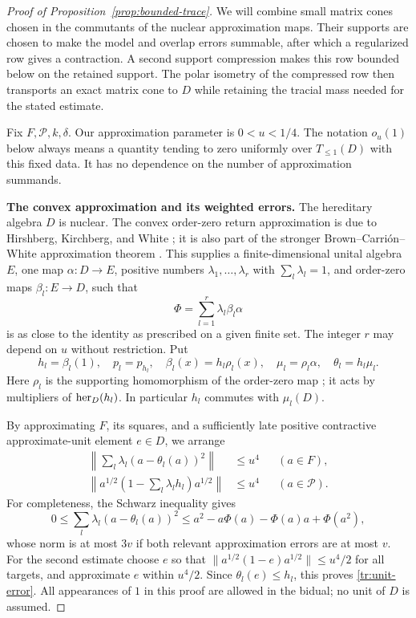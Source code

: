\begin{proof}[Proof of Proposition~\ref{prop:bounded-trace}]
We will combine small matrix cones chosen in the commutants of the
nuclear approximation maps. Their supports are chosen to make the
model and overlap errors summable, after which a regularized row gives
a contraction. A second support compression makes this row bounded
below on the retained support. The polar isometry of the compressed
row then transports an exact matrix cone to $D$ while retaining the
tracial mass needed for the stated estimate.

Fix $F,\mathcal P,k,\delta$.  Our approximation parameter is
$0<u<1/4$.  The notation $o_u(1)$ below always means a quantity tending
to zero uniformly over $T_{\leq1}(D)$ with this fixed data.  It has no
dependence on the number of approximation summands.

\medskip\noindent
\textbf{The convex approximation and its weighted errors.}
The hereditary algebra $D$ is nuclear. The convex order-zero return
approximation is due to Hirshberg, Kirchberg, and White
\cite[Theorem~1.4]{HKW2012}; it is also part of the stronger
Brown--Carri\'on--White approximation theorem
\cite[Theorem~3.1]{BCW2019}. This supplies a finite-dimensional unital algebra
$E$, one \cpc map $\alpha:D\to E$, positive numbers
$\lambda_1,\ldots,\lambda_r$ with $\sum_l\lambda_l=1$, and \cpc
order-zero maps $\beta_l:E\to D$, such that
\[
 \Phi=\sum_{l=1}^r\lambda_l\beta_l\alpha
\]
is as close to the identity as prescribed on a given finite set.
The integer $r$ may depend on $u$ without restriction.  Put
\[
 h_l=\beta_l(1),\quad p_l=p_{h_l},\quad
 \beta_l(x)=h_l\rho_l(x),\quad
 \mu_l=\rho_l\alpha,\quad\theta_l=h_l\mu_l.
\]
Here $\rho_l$ is the supporting homomorphism of the order-zero map
\cite{WZ2009}; it acts by multipliers of $\operatorname{her}_D(h_l)$.
In particular $h_l$ commutes with $\mu_l(D)$.

By approximating $F$, its squares, and a sufficiently late positive
contractive approximate-unit element $e\in D$, we arrange
\begin{align}
 \left\|\sum_l\lambda_l(a-\theta_l(a))^2\right\|
 &\leq u^4 &&(a\in F),\label{tr:mean-square}\\
 \left\|a^{1/2}\left(1-\sum_l\lambda_lh_l\right)a^{1/2}\right\|
 &\leq u^4 &&(a\in\mathcal P).\label{tr:unit-error}
\end{align}
For completeness, the Schwarz inequality gives
\[
 0\leq\sum_l\lambda_l(a-\theta_l(a))^2
 \leq a^2-a\Phi(a)-\Phi(a)a+\Phi(a^2),
\]
whose norm is at most $3v$ if both relevant approximation errors are
at most $v$.  For the second estimate choose $e$ so that
$\|a^{1/2}(1-e)a^{1/2}\|\leq u^4/2$ for all targets, and approximate
$e$ within $u^4/2$.  Since $\theta_l(e)\leq h_l$, this proves
\eqref{tr:unit-error}.  All appearances of $1$ in this proof are allowed
in the bidual; no unit of $D$ is assumed.


\end{proof}
